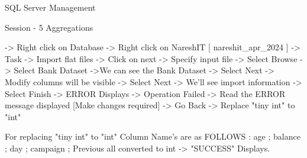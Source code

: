 SQL Server Management

Session - 5 Aggregations

-> Right click on Database -> Right click on NareshIT [ nareshit_apr_2024 ] -> Task -> Import flat files -> Click on next -> Specify input file -> Select Browse -> Select Bank Dataset ->We can see the Bank Dataset -> Select Next -> Modify columns will be visible -> Select Next -> We'll see import information -> Select Finish -> ERROR Displays -> Operation Failed -> Read the ERROR message displayed [Make changes required] -> Go Back -> Replace "tiny int" to "int"

For replacing "tiny int" to "int"
Column Name's are as FOLLOWS : age ; balance ; day ; campaign ; Previous all converted  to int -> "SUCCESS" Displays.
